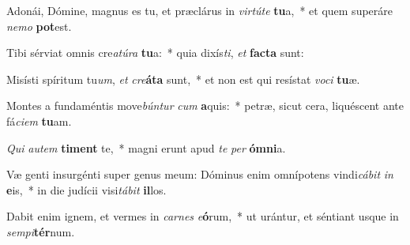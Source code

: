 \item Adonái, Dómine, magnus es tu, et præclárus in \textit{vir}\textit{tú}\textit{te} \textbf{tu}a,~* et quem superáre \textit{ne}\textit{mo} \textbf{pot}est.
\item Tibi sérviat omnis cre\textit{a}\textit{tú}\textit{ra} \textbf{tu}a:~* quia dixís\textit{ti}, \textit{et} \textbf{fac}\textbf{ta} sunt:
\item Misísti spíritum tu\textit{um}, \textit{et} \textit{cre}\textbf{á}\textbf{ta} sunt,~* et non est qui resístat \textit{vo}\textit{ci} \textbf{tu}æ.
\item Montes a fundaméntis move\textit{bún}\textit{tur} \textit{cum} \textbf{a}quis:~* petræ, sicut cera, liquéscent ante fá\textit{ci}\textit{em} \textbf{tu}am.
\item \textit{Qui} \textit{au}\textit{tem} \textbf{ti}\textbf{ment} te,~* magni erunt apud \textit{te} \textit{per} \textbf{óm}\textbf{ni}a.
\item Væ genti insurgénti super genus meum: Dóminus enim omnípotens vindi\textit{cá}\textit{bit} \textit{in} \textbf{e}is,~* in die judícii visi\textit{tá}\textit{bit} \textbf{il}los.
\item Dabit enim ignem, et vermes in \textit{car}\textit{nes} \textit{e}\textbf{ó}rum,~* ut urántur, et séntiant usque in \textit{sem}\textit{pi}\textbf{tér}num.
